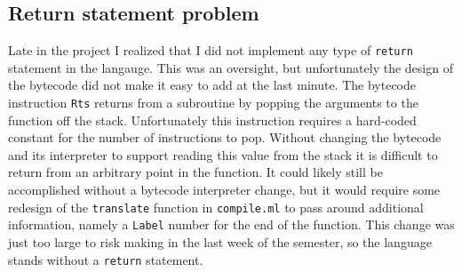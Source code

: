 \subsection{Return statement problem}
\label{sec:lessons-return}
Late in the project I realized that I did not implement any type of \texttt{return} statement in the langauge.  This was an oversight, but unfortunately the design of the bytecode did not make it easy to add at the last minute. The bytecode instruction \texttt{Rts} returns from a subroutine by popping the arguments to the function off the stack.  Unfortunately this instruction requires a hard-coded constant for the number of instructions to pop.  Without changing the bytecode and its interpreter to support reading this value from the stack it is difficult to return from an arbitrary point in the function.  It could likely still be accomplished without a bytecode interpreter change, but it would require some redesign of the \texttt{translate} function in \texttt{compile.ml} to pass around additional information, namely a \texttt{Label} number for the end of the function.  This change was just too large to risk making in the last week of the semester, so the language stands without a \texttt{return} statement.